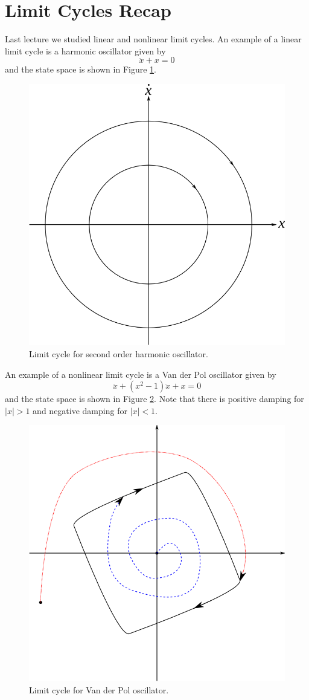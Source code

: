 
\mainmatter
\setcounter{page}{1}

\lectureseries[\course]{\course}

\date{January 7, 2010}

\setaddress

\setcounter{lecture}{1}
\setcounter{chapter}{1}


\section{Limit Cycles Recap}
Last lecture we studied linear and nonlinear limit cycles. An example of a linear limit cycle is a  harmonic oscillator given by
$$\ddot{x} + x = 0$$
and the state space is shown in Figure \ref{fig:02secondorder}.

\begin{figure}[ht!]
	\centering
	\includegraphics[width=.4\textwidth]{images/01secondorder}
	\caption{Limit cycle for second order harmonic oscillator.}
	\label{fig:02secondorder}
\end{figure}

An example of a nonlinear limit cycle is a Van der Pol oscillator given by
$$\ddot{x} + (x^2-1)\ddot{x} + x = 0$$
and the state space is shown in Figure \ref{fig:02vdplc}. Note that there is positive damping for $|x|>1$ and negative damping for $|x|<1$.

\begin{figure}[ht!]
	\centering
	\includegraphics[width=.4\textwidth]{images/02vdplc}
	\caption{Limit cycle for Van der Pol oscillator.}
	\label{fig:02vdplc}
\end{figure}

